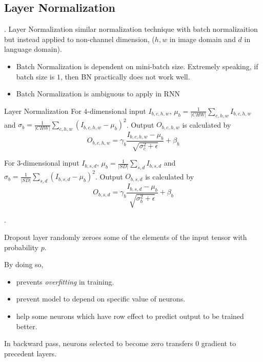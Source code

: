 \documentclass[8pt]{beamer}
\newcommand{\ti}[1]{\textit{#1}}
\newcommand{\abs}[1]{\left\lvert #1 \right\rvert}
\begin{document}
\subsection{Layer Normalization}

\begin{frame}{.}
    Layer Normalization similar normalization technique with batch normalizaition but instead applied to non-channel dimension, ($h,w$ in image domain and $d$ in language domain).
    \begin{itemize}
        \item Batch Normalization is dependent on mini-batch size. Extremely speaking, if batch size is $1$, then BN practically does not work well.
        \item Batch Normalization is ambiguous to apply in RNN
    \end{itemize}

    \begin{block}{Layer Normalization}
        For $4$-dimensional input $I_{b,c,h,w}$, $\mu_b = \frac{1}{\abs{C H W}}\sum_{c,h,w} I_{b,c,h,w}$ and $\sigma_b = \frac{1}{\abs{C H W}} \sum_{c,h,w} (I_{b,c,h,w} - \mu_b)^2$. Output $O_{b,c,h,w}$ is calculated by
        \[
            O_{b,c,h,w} = \gamma_b \frac{I_{b,c,h,w} - \mu_b}{\sqrt{\sigma_c^2 + \epsilon}} + \beta_b
        \]

        For $3$-dimensional input $I_{b,s,d}$, $\mu_b = \frac{1}{\abs{S D}}\sum_{s,d} I_{b,s,d}$ and $\sigma_b = \frac{1}{\abs{S D}} \sum_{s,d} (I_{b,s,d} - \mu_b)^2$. Output $O_{b,s,d}$ is calculated by
        \[
            O_{b,s,d} = \gamma_b \frac{I_{b,s,d} - \mu_b}{\sqrt{\sigma_b^2 + \epsilon}} + \beta_b
        \]
    \end{block}
\end{frame}


\begin{frame}{.}

    Dropout layer randomly zeroes some of the elements of the input tensor with probability $p$.

    By doing so,
    \begin{itemize}
        \item prevents \ti{overfitting} in training.
        \item prevent model to depend on specific value of neurons.
        \item help some neurons which have row effect to predict output to be trained better.
    \end{itemize}

    In backward pass, neurons selected to become zero transfers $0$ gradient to precedent layers.
\end{frame}
\end{document}
